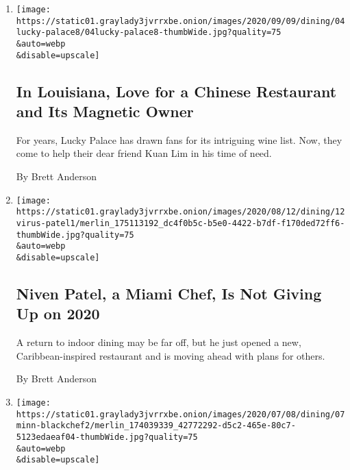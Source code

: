 \begin{enumerate}
\def\labelenumi{\arabic{enumi}.}
\item
  \href{/2020/09/04/dining/lucky-palace-bossier-city-louisiana-restaurant.html}{}

  \texttt{[image: https://static01.graylady3jvrrxbe.onion/images/2020/09/09/dining/04lucky-palace8/04lucky-palace8-thumbWide.jpg?quality=75\\\&auto=webp\\\&disable=upscale]}

  \hypertarget{in-louisiana-love-for-a-chinese-restaurant-and-its-magnetic-owner}{%
  \subsection{In Louisiana, Love for a Chinese Restaurant and Its
  Magnetic
  Owner}\label{in-louisiana-love-for-a-chinese-restaurant-and-its-magnetic-owner}}

  For years, Lucky Palace has drawn fans for its intriguing wine list.
  Now, they come to help their dear friend Kuan Lim in his time of need.

  By Brett Anderson
\item
  \href{/2020/08/10/dining/chef-niven-patel-mamey-coral-gables.html}{}

  \texttt{[image: https://static01.graylady3jvrrxbe.onion/images/2020/08/12/dining/12virus-patel1/merlin\_175113192\_dc4f0b5c-b5e0-4422-b7df-f170ded72ff6-thumbWide.jpg?quality=75\\\&auto=webp\\\&disable=upscale]}

  \hypertarget{niven-patel-a-miami-chef-is-not-giving-up-on-2020}{%
  \subsection{Niven Patel, a Miami Chef, Is Not Giving Up on
  2020}\label{niven-patel-a-miami-chef-is-not-giving-up-on-2020}}

  A return to indoor dining may be far off, but he just opened a new,
  Caribbean-inspired restaurant and is moving ahead with plans for
  others.

  By Brett Anderson
\item
  \href{/2020/07/07/dining/krewe-restaurant-mateo-mackbee-erin-lucas.html}{}

  \texttt{[image: https://static01.graylady3jvrrxbe.onion/images/2020/07/08/dining/07minn-blackchef2/merlin\_174039339\_42772292-d5c2-465e-80c7-5123edaeaf04-thumbWide.jpg?quality=75\\\&auto=webp\\\&disable=upscale]}

  \hypertarget{two-chefs-moved-to-rural-minnesota-to-expand-on-their-mission-of-racial-justice}{%
}
\end{enumerate}
